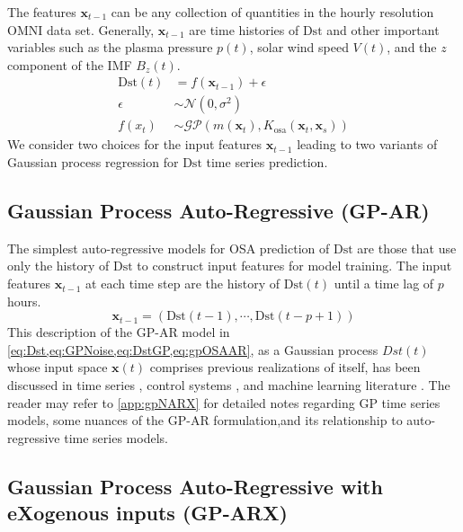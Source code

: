 The features $ \mathbf{x}_{t-1}$ can be any collection of quantities in the hourly resolution OMNI 
data set. Generally, $\mathbf{x}_{t-1}$ are time histories of $\mathrm{Dst}$ and other important 
variables such as the plasma pressure $p(t)$, solar wind speed $V(t)$, and the $z$ component of 
the IMF $B_z(t)$.
%
\begin{align}
    \mathrm{Dst}(t) & =  f(\mathbf{x}_{t-1}) + \epsilon \label{eq:Dst} \\
    \epsilon & \sim  \mathcal{N}(0, \sigma^2) \label{eq:GPNoise} \\
    f(x_t) & \sim  \mathcal{GP}(m(\mathbf{x}_t), K_{\text{osa}}(\mathbf{x}_t, \mathbf{x}_s)) \label{eq:DstGP}
\end{align}
%
We consider two choices for the input features $ \mathbf{x}_{t-1}$ leading to two variants of 
Gaussian process regression for $\mathrm{Dst}$ time series prediction.

\subsection{Gaussian Process Auto-Regressive (GP-AR)} \label{sec:gpar}

The simplest auto-regressive models for OSA prediction of $\mathrm{Dst}$ are those that use 
only the history of $\mathrm{Dst}$ to construct input features for model training. The input 
features $\mathbf{x}_{t-1}$ at each time step are the history of $\mathrm{Dst}(t)$ until a time 
lag of $p$ hours.
%
\begin{equation}\label{eq:gpOSAAR}
    \mathbf{x}_{t-1} = \left(\mathrm{Dst}(t-1), \cdots , \mathrm{Dst}(t-p+1)\right)
\end{equation}
%
This description of the GP-AR model in \cref{eq:Dst,eq:GPNoise,eq:DstGP,eq:gpOSAAR}, as a Gaussian 
process $Dst(t)$ whose input space $\mathbf{x}(t)$ comprises previous realizations of itself, has 
been discussed in time series \citep{roberts2013gaussian}, control systems 
\citep{kocijan2015modelling}, and machine learning literature 
\citep{wang2006gaussian,wang2007gaussian}. The reader may refer to \cref{app:gpNARX} for 
detailed notes regarding GP time series models, some nuances of the GP-AR formulation,and its 
relationship to auto-regressive time series models. 

\subsection{Gaussian Process Auto-Regressive with eXogenous inputs (GP-ARX)} \label{sec:gparx}

